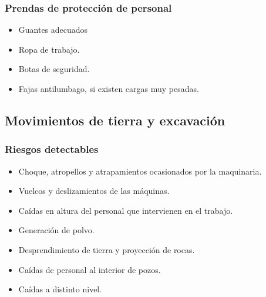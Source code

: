 \subsubsection{Prendas de protección de personal}
\label{subsubsec:sysCarga-EPI}
\begin{itemize}
    \item Guantes adecuados
    \item Ropa de trabajo.
    \item Botas de seguridad.
    \item Fajas antilumbago, si existen cargas muy pesadas.
\end{itemize}
\subsection{Movimientos de tierra y excavación}
\label{subsec:sys-riesgosExcavacion}
\subsubsection{Riesgos detectables}
\label{subsubsec:sysExcavacion-RD}
\begin{itemize}
    \item Choque, atropellos y atrapamientos ocasionados por la maquinaria.
    \item Vuelcos y deslizamientos de las máquinas.
    \item Caídas en altura del personal que intervienen en el trabajo.
    \item Generación de polvo.
    \item Desprendimiento de tierra y proyección de rocas.
    \item Caídas de personal al interior de pozos.
    \item Caídas a distinto nivel.
\end{itemize}
